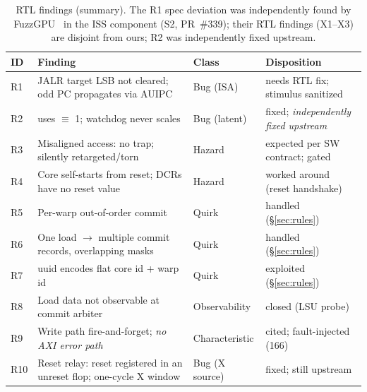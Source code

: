 \documentclass[conference]{IEEEtran}
\newcommand{\code}[1]{\texttt{\detokenize{#1}}}
\begin{document}
\begin{table}[t]
	\caption{RTL findings (summary). The R1 spec deviation was
		independently found by FuzzGPU~\cite{fuzzgpu} in the ISS component
		(S2, PR~\#339); their RTL findings (X1--X3) are disjoint from
		ours; R2 was
		independently fixed upstream.}
	\label{tab:rtlobs}
	\centering
	\scriptsize
	\begin{tabular}{p{0.4cm}p{3.4cm}p{1.7cm}p{1.5cm}}
		\toprule
		ID  & Finding                                                                 & Class          & Disposition                                \\
		\midrule
		R1  & JALR target LSB not cleared; odd PC propagates via AUIPC                & Bug (ISA)      & needs RTL fix; stimulus sanitized          \\
		R2  & \code{STALL_TIMEOUT} uses \code{1**N} $\equiv$ 1; watchdog never scales & Bug (latent)   & fixed; \emph{independently fixed upstream} \\
		R3  & Misaligned access: no trap; silently retargeted/torn                    & Hazard         & expected per SW contract; gated            \\
		R4  & Core self-starts from reset; DCRs have no reset value                   & Hazard         & worked around (reset handshake)            \\
		R5  & Per-warp out-of-order commit                                            & Quirk          & handled (\S\ref{sec:rules})                \\
		R6  & One load $\to$ multiple commit records, overlapping masks               & Quirk          & handled (\S\ref{sec:rules})                \\
		R7  & uuid encodes flat core id + warp id                                     & Quirk          & exploited (\S\ref{sec:rules})              \\
		R8  & Load data not observable at commit arbiter                              & Observability  & closed (LSU probe)                         \\
		R9  & Write path fire-and-forget; \emph{no AXI error path}                    & Characteristic & cited; fault-injected (166)                \\
		R10 & Reset relay: reset registered in an unreset flop; one-cycle X window    & Bug (X source) & fixed; still upstream                      \\
		\bottomrule
	\end{tabular}
\end{table}
\end{document}

